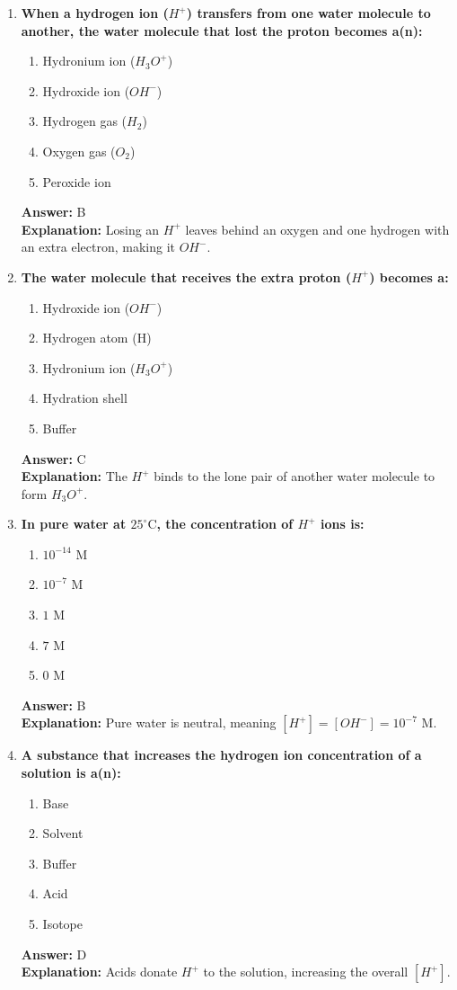 \documentclass[11pt, a4paper]{article}
\begin{document}
\begin{enumerate}
\item \textbf{When a hydrogen ion ($H^+$) transfers from one water molecule to another, the water molecule that lost the proton becomes a(n):}
\begin{enumerate}[label=\Alph*.]
    \item Hydronium ion ($H_3O^+$)
    \item Hydroxide ion ($OH^-$)
    \item Hydrogen gas ($H_2$)
    \item Oxygen gas ($O_2$)
    \item Peroxide ion
\end{enumerate}
\textbf{Answer:} B \\
\textbf{Explanation:} Losing an $H^+$ leaves behind an oxygen and one hydrogen with an extra electron, making it $OH^-$.

\item \textbf{The water molecule that receives the extra proton ($H^+$) becomes a:}
\begin{enumerate}[label=\Alph*.]
    \item Hydroxide ion ($OH^-$)
    \item Hydrogen atom (H)
    \item Hydronium ion ($H_3O^+$)
    \item Hydration shell
    \item Buffer
\end{enumerate}
\textbf{Answer:} C \\
\textbf{Explanation:} The $H^+$ binds to the lone pair of another water molecule to form $H_3O^+$.

\item \textbf{In pure water at $25^\circ\text{C}$, the concentration of $H^+$ ions is:}
\begin{enumerate}[label=\Alph*.]
    \item $10^{-14}$ M
    \item $10^{-7}$ M
    \item $1$ M
    \item $7$ M
    \item $0$ M
\end{enumerate}
\textbf{Answer:} B \\
\textbf{Explanation:} Pure water is neutral, meaning $[H^+] = [OH^-] = 10^{-7}$ M.

\item \textbf{A substance that increases the hydrogen ion concentration of a solution is a(n):}
\begin{enumerate}[label=\Alph*.]
    \item Base
    \item Solvent
    \item Buffer
    \item Acid
    \item Isotope
\end{enumerate}
\textbf{Answer:} D \\
\textbf{Explanation:} Acids donate $H^+$ to the solution, increasing the overall $[H^+]$.


\end{enumerate}
\end{document}
